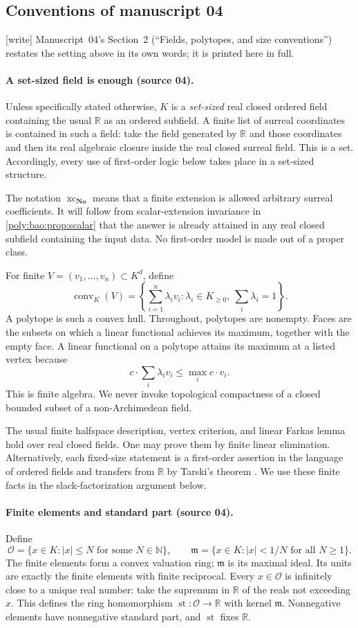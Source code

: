 \documentclass[11pt,a4paper]{article}
\numberwithin{equation}{section}
\theoremstyle{plain}
\newcommand{\wtag}{\textup{[write]}}%
\newcommand{\No}{\mathbf{No}}
\newcommand{\R}{\mathbb R}
\newcommand{\N}{\mathbb N}
\newcommand{\st}{\operatorname{st}}
\newcommand{\conv}{\operatorname{conv}}
\newcommand{\OO}{\mathcal O}
\newcommand{\mm}{\mathfrak m}
\newcommand{\xc}{\operatorname{xc}}
\begin{document}
\subsection{Conventions of manuscript 04}\label{poly:bao:sec:fields}
\wtag{} Manuscript~04's Section~2 (``Fields, polytopes, and size
conventions'') restates the setting above in its own words; it is printed
here in full.

\paragraph{A set-sized field is enough (source 04).}
Unless specifically stated otherwise, $K$ is a \emph{set-sized} real closed
ordered field containing the usual $\R$ as an ordered subfield. A finite
list of surreal coordinates is contained in such a field: take the field
generated by $\R$ and those coordinates and then its real algebraic closure
inside the real closed surreal field. This is a set. Accordingly, every
use of first-order logic below takes place in a set-sized structure.

The notation $\xc_{\No}$ means that a finite extension is allowed arbitrary
surreal coefficients. It will follow from scalar-extension invariance in
\cref{poly:bao:prop:scalar} that the answer is already attained in any real closed
subfield containing the input data. No first-order model is made out of a
proper class.

For finite $V=(v_1,\ldots,v_n)\subset K^d$, define
\[
 \conv_K(V)=\left\{\sum_{i=1}^n\lambda_i v_i:
 \lambda_i\in K_{\geq0},\ \sum_i\lambda_i=1\right\}.
\]
A polytope is such a convex hull. Throughout, polytopes are nonempty.
Faces are the subsets on which a linear
functional achieves its maximum, together with the empty face. A linear
functional on a polytope attains its maximum at a listed vertex because
\[
 c\cdot\sum_i\lambda_i v_i\leq\max_i c\cdot v_i.
\]
This is finite algebra. We never invoke topological compactness of a closed
bounded subset of a non-Archimedean field.

The usual finite halfspace description, vertex criterion, and linear
Farkas lemma hold over real closed fields. One may prove them by finite
linear elimination. Alternatively, each fixed-size statement is a
first-order assertion in the language of ordered fields and transfers
from $\R$ by Tarski's theorem \cite{bao:Tarski}. We use these finite facts in
the slack-factorization argument below.

\paragraph{Finite elements and standard part (source 04).}
Define
\[
 \OO=\{x\in K: |x|\leq N\text{ for some }N\in\N\},\qquad
 \mm=\{x\in K: |x|<1/N\text{ for all }N\geq1\}.
\]
The finite elements form a convex valuation ring; $\mm$ is its maximal
ideal. Its units are exactly the finite elements with finite reciprocal.
Every $x\in\OO$ is infinitely close to a unique real number: take the
supremum in $\R$ of the reals not exceeding $x$. This defines the ring
homomorphism $\st:\OO\to\R$ with kernel $\mm$. Nonnegative elements have
nonnegative standard part, and $\st$ fixes $\R$.
\end{document}
